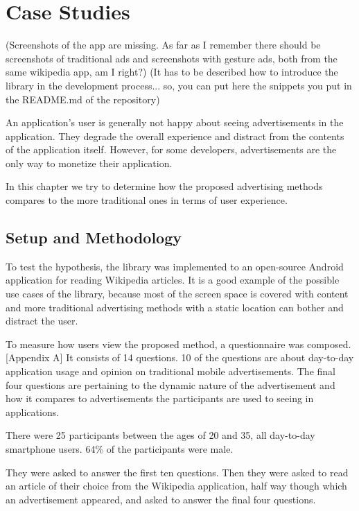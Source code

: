 \chapter{Case Studies}

(Screenshots of the app are missing. As far as I remember there should be screenshots of traditional ads and screenshots with gesture ads, both from the same wikipedia app, am I right?)
(It has to be described how to introduce the library in the development process... so, you can put here the snippets you put in the README.md of the repository)

An application's user is generally not happy about seeing advertisements in the application. They degrade the overall experience and distract from the contents of the application itself. However, for some developers, advertisements are the only way to monetize their application.

In this chapter we try to determine how the proposed advertising methods compares to the more traditional ones in terms of user experience.

\section{Setup and Methodology}

To test the hypothesis, the library was implemented to an open-source Android application for reading Wikipedia articles. It is a good example of the possible use cases of the library, because most of the screen space is covered with content and more traditional advertising methods with a static location can bother and distract the user.

To measure how users view the proposed method, a questionnaire was composed. [Appendix A] It consists of 14 questions. 10 of the questions are about day-to-day application usage and opinion on traditional mobile advertisements. The final four questions are pertaining to the dynamic nature of the advertisement and how it compares to advertisements the participants are used to seeing in applications.

There were 25 participants between the ages of 20 and 35, all day-to-day smartphone users. 64\% of the participants were male.

They were asked to answer the first ten questions. Then they were asked to read an article of their choice from the Wikipedia application, half way though which an advertisement appeared, and asked to answer the final four questions.

